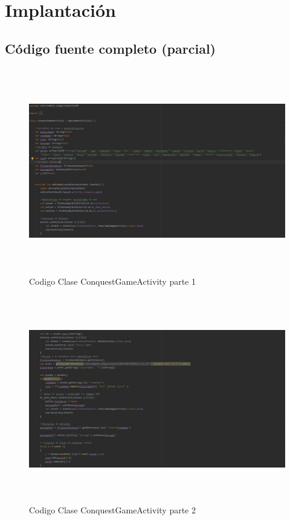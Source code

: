 \section{Implantación}
\subsection{Código fuente completo (parcial)}
\begin{figure}[H]
	\centering
	\includegraphics[width=16cm, height=9cm]{imgs/SourceCode1.jpg}
	\caption{Codigo Clase ConquestGameActivity parte 1}
\end{figure}
\begin{figure}[H]
	\centering
	\includegraphics[width=16cm, height=9cm]{imgs/SourceCode2.jpg}
	\caption{Codigo Clase ConquestGameActivity parte 2}
\end{figure}
